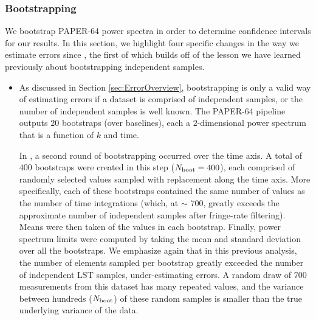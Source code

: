 \documentclass[preprint2,numberedappendix,tighten]{aastex6}  %
\begin{document}
\subsubsection{Bootstrapping}
\label{sec:Boot}

We bootstrap PAPER-64 power spectra in order to determine confidence intervals for our results. In this section, we highlight 
four specific changes in the way we estimate errors since , the first of which builds off of the lesson we have learned previously about bootstrapping independent samples. 

\begin{itemize}

\item{As discussed in Section \ref{sec:ErrorOverview}, bootstrapping is only a valid way of estimating errors if a dataset is comprised 
of independent samples, or the number of independent samples is well known. The PAPER-64 pipeline outputs $20$ bootstraps (over baselines), each a $2$-dimensional power 
spectrum that is a function of $k$ and time. 

In , a second round of bootstrapping occurred over the time axis. A total of $400$ bootstraps were created in this step 
($N_{\rm boot} = 400$), each comprised of randomly selected values sampled with replacement along the time axis. More 
specifically, each of these bootstraps contained the same number of values as the number of time integrations (which, at $\sim$
$700$, greatly exceeds the approximate number of independent samples after fringe-rate filtering).
Means were then taken of the values in each bootstrap. Finally, power 
spectrum limits were computed by taking the mean and standard deviation over all the bootstraps. We emphasize again that in 
this previous analysis, the number of elements sampled per bootstrap greatly 
exceeded the number of independent LST samples, under-estimating errors. A random draw of $700$ 
measurements from this dataset has many repeated values, and the variance between hundreds ($N_{\rm boot}$) of these random 
samples is smaller than the true underlying variance of the data. 

}
\end{itemize}
\end{document}
